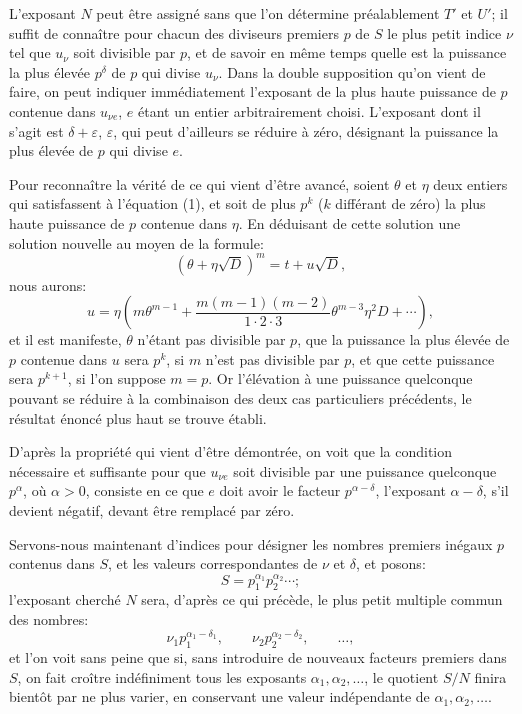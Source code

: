 \documentclass[11pt]{article}
\begin{document}
L'exposant \(N\) peut être assigné sans que l'on détermine préalablement \(T'\) et \(U'\); il suffit de connaître pour chacun des diviseurs premiers \(p\) de \(S\) le plus petit indice \(\nu\) tel que \(u_\nu\) soit divisible par \(p\), et de savoir en même temps quelle est la puissance la plus élevée \(p^\delta\) de \(p\) qui divise \(u_\nu\). Dans la double supposition qu'on vient de faire, on peut indiquer immédiatement l'exposant de la plus haute puissance de \(p\) contenue dans \(u_{\nu e}\), \(e\) étant un entier arbitrairement choisi. L'exposant dont il s'agit est \(\delta+\varepsilon\), \(\varepsilon\), qui peut d'ailleurs se réduire à zéro, désignant la puissance la plus élevée de \(p\) qui divise \(e\).

Pour reconnaître la vérité de ce qui vient d'être avancé, soient \(\theta\) et \(\eta\) deux entiers qui satisfassent à l'équation (1), et soit de plus \(p^k\) (\(k\) différant de zéro) la plus haute puissance de \(p\) contenue dans \(\eta\). En déduisant de cette solution une solution nouvelle au moyen de la formule:
\[
(\theta+\eta\sqrt D)^m=t+u\sqrt D,
\]
nous aurons:
\[
u=\eta\left(m\theta^{m-1}
+\frac{m(m-1)(m-2)}{1\cdot2\cdot3}\theta^{m-3}\eta^2D+\cdots\right),
\]
et il est manifeste, \(\theta\) n'étant pas divisible par \(p\), que la puissance la plus élevée de \(p\) contenue dans \(u\) sera \(p^k\), si \(m\) n'est pas divisible par \(p\), et que cette puissance sera \(p^{k+1}\), si l'on suppose \(m=p\). Or l'élévation à une puissance quelconque pouvant se réduire à la combinaison des deux cas particuliers précédents, le résultat énoncé plus haut se trouve établi.

D'après la propriété qui vient d'être démontrée, on voit que la condition nécessaire et suffisante pour que \(u_{\nu e}\) soit divisible par une puissance quelconque \(p^\alpha\), où \(\alpha>0\), consiste en ce que \(e\) doit avoir le facteur \(p^{\alpha-\delta}\), l'exposant \(\alpha-\delta\), s'il devient négatif, devant être remplacé par zéro.

Servons-nous maintenant d'indices pour désigner les nombres premiers inégaux \(p\) contenus dans \(S\), et les valeurs correspondantes de \(\nu\) et \(\delta\), et posons:
\[
S=p_1^{\alpha_1}p_2^{\alpha_2}\cdots;
\]
l'exposant cherché \(N\) sera, d'après ce qui précède, le plus petit multiple commun des nombres:
\[
\nu_1p_1^{\alpha_1-\delta_1},\qquad
\nu_2p_2^{\alpha_2-\delta_2},\qquad \ldots,
\]
et l'on voit sans peine que si, sans introduire de nouveaux facteurs premiers dans \(S\), on fait croître indéfiniment tous les exposants \(\alpha_1,\alpha_2,\ldots\), le quotient \(S/N\) finira bientôt par ne plus varier, en conservant une valeur indépendante de \(\alpha_1,\alpha_2,\ldots\).
\end{document}
